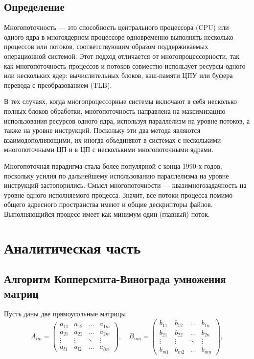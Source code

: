 \documentclass[12pt]{report}
\begin{document}
\section*{Определение}
Многопоточность — это способность центрального процессора (CPU) или одного ядра в многоядерном процессоре одновременно выполнять несколько процессов или потоков, соответствующим образом поддерживаемых операционной системой.
Этот подход отличается от многопроцессорности, так как многопоточность процессов и потоков совместно использует ресурсы одного или нескольких ядер: вычислительных блоков, кэш-памяти ЦПУ или буфера перевода с преобразованием (TLB).

В тех случаях, когда многопроцессорные системы включают в себя несколько полных блоков обработки, многопоточность направлена на максимизацию использования ресурсов одного ядра, используя параллелизм на уровне потоков, а также на уровне инструкций.
Поскольку эти два метода являются взаимодополняющими, их иногда объединяют в системах с несколькими многопоточными ЦП и в ЦП с несколькими многопоточными ядрами.

Многопоточная парадигма стала более популярной с конца 1990-х годов, поскольку усилия по дальнейшему использованию параллелизма на уровне инструкций застопорились.
Смысл многопоточности — квазимногозадачность на уровне одного исполняемого процесса.
Значит, все потоки процесса помимо общего адресного пространства имеют и общие дескрипторы файлов. Выполняющийся процесс имеет как минимум один (главный) поток.

\chapter{Аналитическая часть}
\section{Алгоритм Копперсмита-Винограда умножения матриц}
Пусть даны две прямоугольные матрицы
\begin{equation}
	A_{lm} = \begin{pmatrix}
		a_{11} & a_{12} & \ldots & a_{1m}\\
		a_{21} & a_{22} & \ldots & a_{2m}\\
		\vdots & \vdots & \ddots & \vdots\\
		a_{l1} & a_{l2} & \ldots & a_{lm}
	\end{pmatrix},
	\quad
	B_{mn} = \begin{pmatrix}
		b_{11} & b_{12} & \ldots & b_{1n}\\
		b_{21} & b_{22} & \ldots & b_{2n}\\
		\vdots & \vdots & \ddots & \vdots\\
		b_{m1} & b_{m2} & \ldots & b_{mn}
	\end{pmatrix},
\end{equation}
\end{document}
